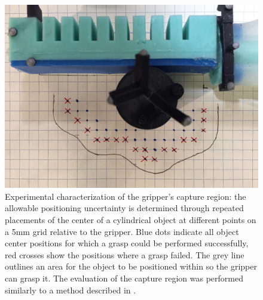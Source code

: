 
\begin{figure}[htb]
\centering
   \includegraphics[width=0.8\columnwidth]{Figures/experimental_results/uncertainty}
   \caption{Experimental characterization of the gripper's capture region: the allowable positioning uncertainty is determined through repeated placements of the center of a cylindrical object at different points on a 5\unit{mm} grid relative to the gripper. Blue dots indicate all object center positions for which a grasp could be performed successfully, red crosses show the positions where a grasp failed. The grey line outlines an area for the object to be positioned within so the gripper can grasp it. The evaluation of the capture region was performed similarly to a method described in \cite{dogar2010push}.}
   \label{fig:grasp_uncertainty}
\end{figure} 


